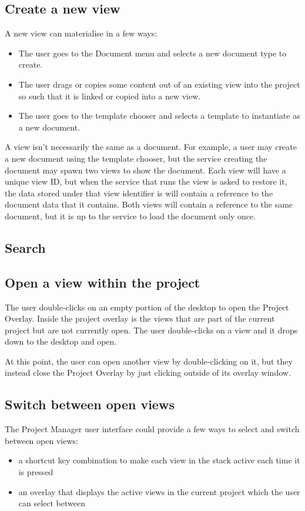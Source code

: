 \documentclass[11pt]{report}
\newcommand{\proman}{Project Manager\xspace}
\begin{document}
\subsection{Create a new view}
A new view can materialise in a few ways:
\begin{itemize}
\item The user goes to the Document menu and selects a new document type to create.
\item The user drags or copies some content out of an existing view into the project so such that it is linked or copied into a new view.
\item The user goes to the template chooser and selects a template to instantiate as a new document.
\end{itemize}

A view isn't necessarily the same as a document. For example, a user may create a new document using the template chooser, but the service creating the document may spawn two views to show the document. Each view will have a unique view ID, but when the service that runs the view is asked to restore it, the data stored under that view identifier is will contain a reference to the document data that it contains. Both views will contain a reference to the same document, but it is up to the service to load the document only once.

\subsection{Search}


\subsection{Open a view within the project}
The user double-clicks on an empty portion of the desktop to open the Project Overlay. Inside the project overlay is the views that are part of the current project but are not currently open. The user double-clicks on a view and it drops down to the desktop and open. 

At this point, the user can open another view by double-clicking on it, but they instead close the Project Overlay by just clicking outside of its overlay window.

\subsection{Switch between open views}
The \proman user interface could provide a few ways to select and switch between open views:
\begin{itemize}
\item a shortcut key combination to make each view in the stack active each time it is pressed
\item an overlay that displays the active views in the current project which the user can select between
\end{itemize}
\end{document}
